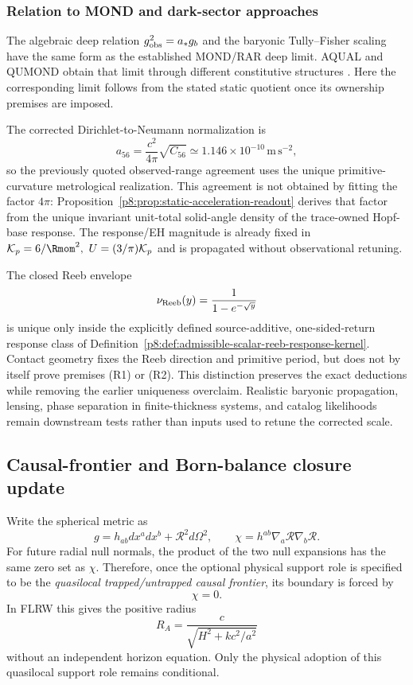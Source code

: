 \documentclass[12pt,a4paper]{article}
\begin{document}
\subsubsection{Relation to MOND and dark-sector approaches}
\label{p8:sec:rar-literature-positioning}
The algebraic deep relation $g_{\rm obs}^2=a_*g_b$ and the baryonic Tully--Fisher scaling have the same form as the established MOND/RAR deep limit.  AQUAL and QUMOND obtain that limit through different constitutive structures \cite{BekensteinMilgrom1984AQUAL,Milgrom2010QUMOND}.  Here the corresponding limit follows from the stated static quotient once its ownership premises are imposed.

The corrected Dirichlet-to-Neumann normalization is
\[
a_{56}=\frac{c^2}{4\pi}\sqrt{C_{56}}
\simeq1.146\times10^{-10}\,\mathrm{m\,s^{-2}},
\]
so the previously quoted observed-range agreement uses the unique primitive-curvature metrological realization.  This agreement is not obtained by fitting the
factor \(4\pi\): Proposition~\ref{p8:prop:static-acceleration-readout} derives
that factor from the unique invariant unit-total solid-angle density of the
trace-owned Hopf-base response.  The response/EH magnitude is already fixed in \(\mathcal K_p=6/\Rmom^2,\ U=(3/\pi)\mathcal K_p\) and is propagated without observational retuning.

The closed Reeb envelope
\[
\nu_{\rm Reeb}(y)=\frac{1}{1-e^{-\sqrt y}}
\]
is unique only inside the explicitly defined source-additive, one-sided-return response class of Definition~\ref{p8:def:admissible-scalar-reeb-response-kernel}.  Contact geometry fixes the Reeb direction and primitive period, but does not by itself prove premises (R1) or (R2).  This distinction preserves the exact deductions while removing the earlier uniqueness overclaim.  Realistic baryonic propagation, lensing, phase separation in finite-thickness systems, and catalog likelihoods remain downstream tests rather than inputs used to retune the corrected scale.

\subsection{Causal-frontier and Born-balance closure update}
\label{p8:sec:g10-g6-update}

Write the spherical metric as
\[
 g=h_{ab}dx^adx^b+\mathcal R^2d\Omega^2,
 \qquad
 \chi=h^{ab}\nabla_a\mathcal R\nabla_b\mathcal R.
\]
For future radial null normals, the product of the two null expansions has the
same zero set as $\chi$.  Therefore, once the optional physical support role is
specified to be the \emph{quasilocal trapped/untrapped causal frontier}, its
boundary is forced by
\[
 \boxed{\chi=0.}
\]
In FLRW this gives the positive radius
\[
 \boxed{R_A=\frac{c}{\sqrt{H^2+kc^2/a^2}}}
\]
without an independent horizon equation.  Only the physical adoption of this
quasilocal support role remains conditional.
\end{document}
